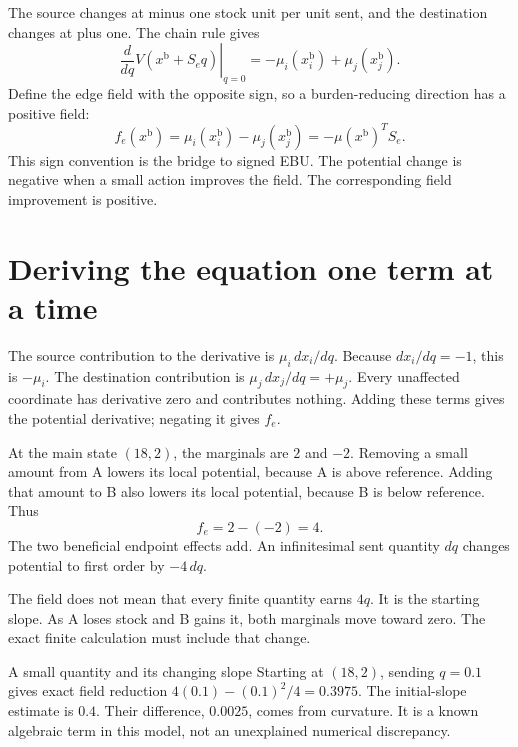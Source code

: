 The source changes at minus one stock unit per unit sent, and the destination changes at plus one. The chain rule gives
\begin{equation}
 \left.\frac{d}{dq}V(x^{\mathrm{b}}+S_e q)\right|_{q=0}
 =-\mu_i(x^{\mathrm{b}}_i)+\mu_j(x^{\mathrm{b}}_j).
\end{equation}
Define the edge field with the opposite sign, so a burden-reducing direction has a positive field:
\begin{equation}\label{eq:lossless-edge-field}
 f_e(x^{\mathrm{b}})=\mu_i(x^{\mathrm{b}}_i)-\mu_j(x^{\mathrm{b}}_j)=-\mu(x^{\mathrm{b}})^TS_e.
\end{equation}
This sign convention is the bridge to signed EBU. The potential change is negative when a small action improves the field. The corresponding field improvement is positive.

\section{Deriving the equation one term at a time}
The source contribution to the derivative is \(\mu_i\,dx_i/dq\). Because \(dx_i/dq=-1\), this is \(-\mu_i\). The destination contribution is \(\mu_j\,dx_j/dq=+\mu_j\). Every unaffected coordinate has derivative zero and contributes nothing. Adding these terms gives the potential derivative; negating it gives \(f_e\).

At the main state \((18,2)\), the marginals are \(2\) and \(-2\). Removing a small amount from A lowers its local potential, because A is above reference. Adding that amount to B also lowers its local potential, because B is below reference. Thus
\begin{equation}
 f_e=2-(-2)=4.
\end{equation}
The two beneficial endpoint effects add. An infinitesimal sent quantity \(dq\) changes potential to first order by \(-4\,dq\).

The field does not mean that every finite quantity earns \(4q\). It is the starting slope. As A loses stock and B gains it, both marginals move toward zero. The exact finite calculation must include that change.

\begin{workedbox}{A small quantity and its changing slope}
Starting at \((18,2)\), sending \(q=0.1\) gives exact field reduction \(4(0.1)-(0.1)^2/4=0.3975\). The initial-slope estimate is \(0.4\). Their difference, \(0.0025\), comes from curvature. It is a known algebraic term in this model, not an unexplained numerical discrepancy.
\end{workedbox}

